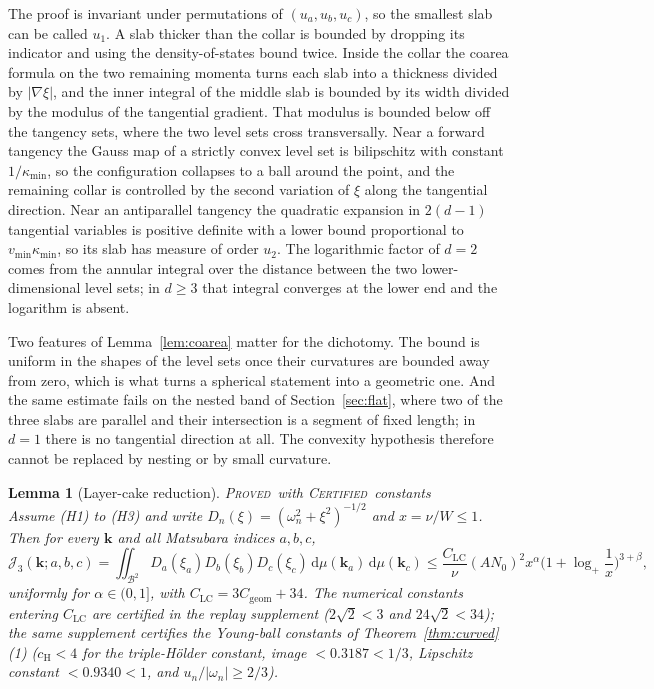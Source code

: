 \documentclass[11pt]{article}
\newcommand{\PROVED}{\upshape\mdseries\textsc{Proved}}
\newcommand{\CERT}{\upshape\mdseries\textsc{Certified}}
\newcommand{\dd}{\,\mathrm d}
\newcommand{\Cgeom}{C_{\mathrm{geom}}}
\newcommand{\CLC}{C_{\mathrm{LC}}}
\newtheorem{lemma}[theorem]{Lemma}
\theoremstyle{definition}
\theoremstyle{remark}
\begin{document}
The proof is invariant under permutations of $(u_a,u_b,u_c)$, so the smallest slab can be called $u_1$. A slab thicker than the collar is bounded by dropping its indicator and using the density-of-states bound twice. Inside the collar the coarea formula on the two remaining momenta turns each slab into a thickness divided by $|\nabla\xi|$, and the inner integral of the middle slab is bounded by its width divided by the modulus of the tangential gradient. That modulus is bounded below off the tangency sets, where the two level sets cross transversally. Near a forward tangency the Gauss map of a strictly convex level set is bilipschitz with constant $1/\kappa_{\min}$, so the configuration collapses to a ball around the point, and the remaining collar is controlled by the second variation of $\xi$ along the tangential direction. Near an antiparallel tangency the quadratic expansion in $2(d-1)$ tangential variables is positive definite with a lower bound proportional to $v_{\min}\kappa_{\min}$, so its slab has measure of order $u_2$. The logarithmic factor of $d=2$ comes from the annular integral over the distance between the two lower-dimensional level sets; in $d\ge3$ that integral converges at the lower end and the logarithm is absent.

Two features of Lemma~\ref{lem:coarea} matter for the dichotomy. The bound is uniform in the shapes of the level sets once their curvatures are bounded away from zero, which is what turns a spherical statement into a geometric one. And the same estimate fails on the nested band of Section~\ref{sec:flat}, where two of the three slabs are parallel and their intersection is a segment of fixed length; in $d=1$ there is no tangential direction at all. The convexity hypothesis therefore cannot be replaced by nesting or by small curvature.

\begin{lemma}[Layer-cake reduction]\label{lem:layercake}\hfill\PROVED\ with \CERT\ constants\\
Assume (H1) to (H3) and write $D_n(\xi)=(\omega_n^2+\xi^2)^{-1/2}$ and $x=\nu/W\le1$. Then for every $\mathbf k$ and all Matsubara indices $a,b,c$,
\begin{equation}\label{eq:layercake}
\mathcal J_3(\mathbf k;a,b,c)=\iint_{\mathcal B^2}D_a(\xi_a)D_b(\xi_b)D_c(\xi_c)\dd\mu(\mathbf k_a)\dd\mu(\mathbf k_c)\le\frac{\CLC}{\nu}(AN_0)^2x^{\alpha}\Big(1+\log_+\frac1x\Big)^{3+\beta},
\end{equation}
uniformly for $\alpha\in(0,1]$, with $\CLC=3\Cgeom+34$. The numerical constants entering $\CLC$ are certified in the replay supplement ($2\sqrt2<3$ and $24\sqrt2<34$); the same supplement certifies the Young-ball constants of Theorem~\ref{thm:curved}(1) ($c_{\mathrm H}<4$ for the triple-H\"older constant, image $<0.3187<1/3$, Lipschitz constant $<0.9340<1$, and $u_n/|\omega_n|\ge2/3$).
\end{lemma}
\end{document}
